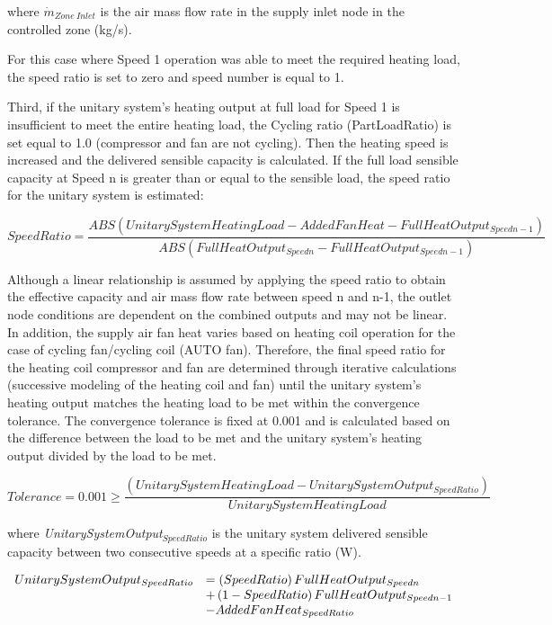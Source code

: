 where \({\dot m_{Zone~Inlet}}\) is the air mass flow rate in the supply inlet node in the controlled zone (kg/s).

For this case where Speed 1 operation was able to meet the required heating load, the speed ratio is set to zero and speed number is equal to 1.

Third, if the unitary system's heating output at full load for Speed 1 is insufficient to meet the entire heating load, the Cycling ratio (PartLoadRatio) is set equal to 1.0 (compressor and fan are not cycling). Then the heating speed is increased and the delivered sensible capacity is calculated. If the full load sensible capacity at Speed n is greater than or equal to the sensible load, the speed ratio for the unitary system is estimated:

\begin{equation}
SpeedRatio = \frac{{ABS\left( {UnitarySystemHeatingLoad - AddedFanHeat - FullHeatOutpu{t_{Speedn - 1}}} \right)}}{{ABS\left( {FullHeatOutpu{t_{Speedn}} - FullHeatOutpu{t_{Speedn - 1}}} \right)}}
\end{equation}

Although a linear relationship is assumed by applying the speed ratio to obtain the effective capacity and air mass flow rate between speed n and n-1, the outlet node conditions are dependent on the combined outputs and may not be linear. In addition, the supply air fan heat varies based on heating coil operation for the case of cycling fan/cycling coil (AUTO fan). Therefore, the final speed ratio for the heating coil compressor and fan are determined through iterative calculations (successive modeling of the heating coil and fan) until the unitary system's heating output matches the heating load to be met within the convergence tolerance. The convergence tolerance is fixed at 0.001 and is calculated based on the difference between the load to be met and the unitary system's heating output divided by the load to be met.

\begin{equation}
Tolerance = 0.001 \ge \frac{{\left( {UnitarySystemHeatingLoad - UnitarySystemOutpu{t_{SpeedRatio}}} \right)}}{{UnitarySystemHeatingLoad}}
\end{equation}

where \emph{UnitarySystemOutput\(_{SpeedRatio}\)} is the unitary system delivered sensible capacity between two consecutive speeds at a specific ratio (W).

\begin{equation}
  \begin{array}{rl}
    UnitarySystemOutput_{SpeedRatio} &= \PB{SpeedRatio} FullHeatOutput_{Speedn} \\
                                     &+ \PB{1 - SpeedRatio} FullHeatOutput_{Speedn-1} \\ 
                                     &- AddedFanHeat_{SpeedRatio}
  \end{array}
\end{equation}

